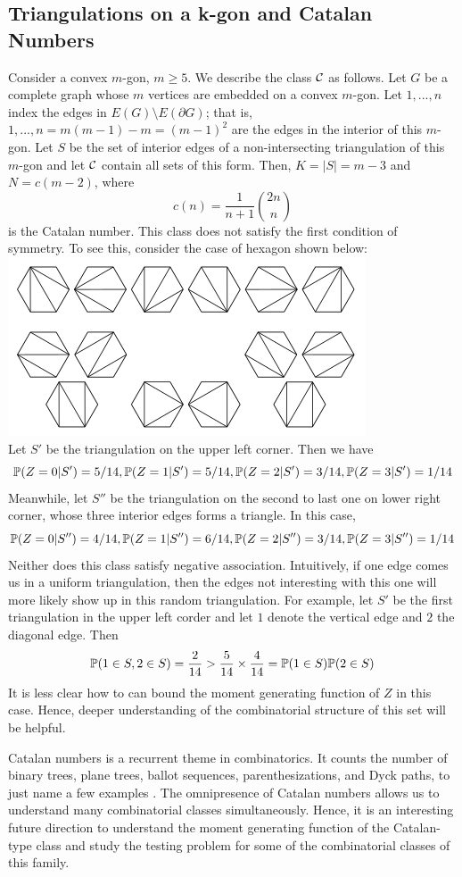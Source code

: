 \documentclass[10pt, oneside]{article}
\begin{document}
\subsection{Triangulations on a k-gon and Catalan Numbers}
Consider a convex $m$-gon, $m \ge 5$. We describe the class ${\mathcal C}$ as follows. Let $G$ be a complete graph whose $m$ vertices are embedded on a convex $m$-gon. Let $1,...,n$ index the edges in $E(G)\setminus E(\partial G)$; that is, $1,..., n = m(m-1) - m = (m-1)^2$ are the edges in the interior of this $m$-gon. Let $S$ be the set of interior edges of a non-intersecting triangulation of this $m$-gon and let ${\mathcal C}$ contain all sets of this form. Then,
$K = |S| = m - 3$ and $N = c(m-2)$, where $$c(n) = \frac{1}{n+1}\binom{2n}{n}$$
is the Catalan number. This class does not satisfy the first condition of symmetry. To see this, consider the case of hexagon shown below:\\
\includegraphics{hexagon.png}\\
Let $S'$ be the triangulation on the upper left corner. Then we have 
$$\mathbb{P}(Z = 0|S') = 5/14, \mathbb{P}(Z = 1|S') = 5/14, \mathbb{P}(Z = 2|S') = 3/14, \mathbb{P}(Z = 3|S') = 1/14$$
Meanwhile, let $S''$ be the triangulation on the second to last one on lower right corner, whose three interior edges forms a triangle. In this case,
$$\mathbb{P}(Z = 0|S'') = 4/14, \mathbb{P}(Z = 1|S'') = 6/14, \mathbb{P}(Z = 2|S'') = 3/14, \mathbb{P}(Z = 3|S'') = 1/14$$
Neither does this class satisfy negative association. Intuitively, if one edge comes us in a uniform triangulation, then the edges not interesting with this one will more likely show up in this random triangulation. For example, let $S'$ be the first triangulation in the upper left corder and let $1$ denote the vertical edge and $2$ the diagonal edge. Then
$$\mathbb{P}(1 \in S, 2 \in S) = \frac{2}{14} > \frac{5}{14} \times \frac{4}{14} = \mathbb{P}(1 \in S)\mathbb{P}(2 \in S) $$
It is less clear how to can bound the moment generating function of $Z$ in this case. Hence, deeper understanding of the combinatorial structure of this set will be helpful.

Catalan numbers is a recurrent theme in combinatorics. It counts the number of binary trees, plane trees, ballot sequences, parenthesizations, and Dyck paths, to just name a few examples \cite{stanley2015catalan}. The omnipresence of Catalan numbers allows us to understand many combinatorial classes simultaneously. Hence, it is an interesting future direction to understand the moment generating function of the Catalan-type class and study the testing problem for some of the combinatorial classes of this family. 


\end{document}
